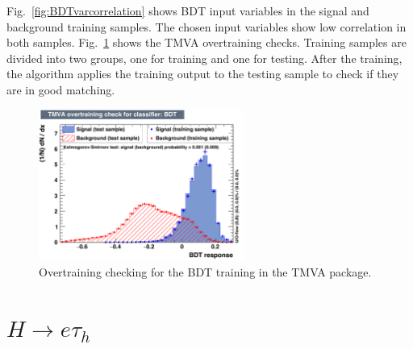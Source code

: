 Fig.~\ref{fig:BDTvarcorrelation} shows BDT input variables in the signal and background training samples. The chosen input variables show low correlation in both samples. Fig.~\ref{fig:BDTovertraining} shows the TMVA overtraining checks. Training samples are divided into two groups, one for training and one for testing. After the training, the algorithm applies the training output to the testing sample to check if they are in good matching.

\begin{figure}[htbp] 
\centering
\includegraphics[width=0.6\textwidth]{chapter6/overtrain_BDT.pdf}
\caption{Overtraining checking for the BDT training in the TMVA package.}
\label{fig:BDTovertraining}
\end{figure}

\section{\texorpdfstring{$H\rightarrow e \tau_h$}{Lg}}

